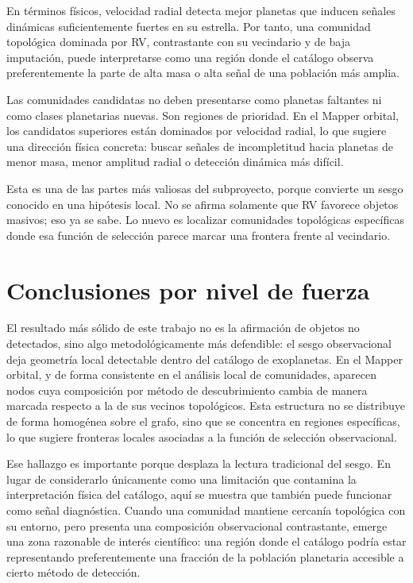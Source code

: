 \documentclass[11pt]{article}
\begin{document}
En términos físicos, velocidad radial detecta mejor planetas que inducen señales dinámicas suficientemente fuertes en su estrella. Por tanto, una comunidad topológica dominada por RV, contrastante con su vecindario y de baja imputación, puede interpretarse como una región donde el catálogo observa preferentemente la parte de alta masa o alta señal de una población más amplia.

Las comunidades candidatas no deben presentarse como planetas faltantes ni como clases planetarias nuevas. Son regiones de prioridad. En el Mapper orbital, los candidatos superiores están dominados por velocidad radial, lo que sugiere una dirección física concreta: buscar señales de incompletitud hacia planetas de menor masa, menor amplitud radial o detección dinámica más difícil.

Esta es una de las partes más valiosas del subproyecto, porque convierte un sesgo conocido en una hipótesis local. No se afirma solamente que RV favorece objetos masivos; eso ya se sabe. Lo nuevo es localizar comunidades topológicas específicas donde esa función de selección parece marcar una frontera frente al vecindario.

\section{Conclusiones por nivel de fuerza}

El resultado más sólido de este trabajo no es la afirmación de objetos no detectados, sino algo metodológicamente más defendible: el sesgo observacional deja geometría local detectable dentro del catálogo de exoplanetas. En el Mapper orbital, y de forma consistente en el análisis local de comunidades, aparecen nodos cuya composición por método de descubrimiento cambia de manera marcada respecto a la de sus vecinos topológicos. Esta estructura no se distribuye de forma homogénea sobre el grafo, sino que se concentra en regiones específicas, lo que sugiere fronteras locales asociadas a la función de selección observacional.

Ese hallazgo es importante porque desplaza la lectura tradicional del sesgo. En lugar de considerarlo únicamente como una limitación que contamina la interpretación física del catálogo, aquí se muestra que también puede funcionar como señal diagnóstica. Cuando una comunidad mantiene cercanía topológica con su entorno, pero presenta una composición observacional contrastante, emerge una zona razonable de interés científico: una región donde el catálogo podría estar representando preferentemente una fracción de la población planetaria accesible a cierto método de detección.
\end{document}
